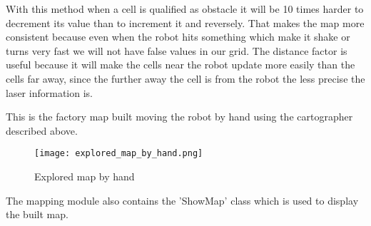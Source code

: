 With this method when a cell is qualified as obstacle it will be 10 times harder to decrement its value than to increment it and reversely.
That makes the map more consistent because even when the robot hits something which make it shake or turns very fast we will not have false values in our grid.
The distance factor is useful because it will make the cells near the robot update more easily than the cells far away, since the further away the cell is from the robot the less precise the laser information is.

This is the factory map built moving the robot by hand using the cartographer described above.

\FloatBarrier
\begin{figure}
    \centering\texttt{[image: explored\_map\_by\_hand.png]}
    \label{fig:explored_map_by_hand}
    \caption{Explored map by hand}
\end{figure}
\FloatBarrier

The mapping module also contains the 'ShowMap' class which is used to display the built map.
